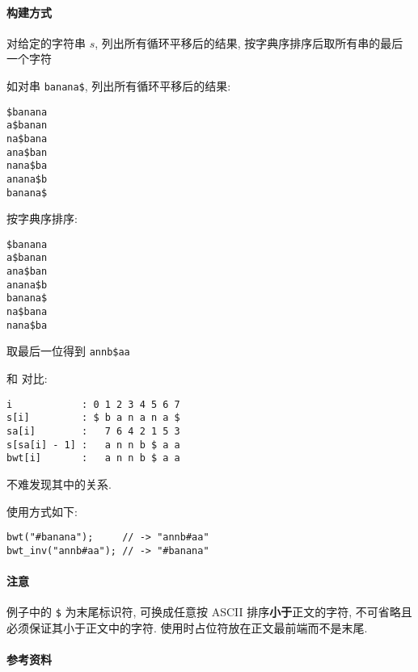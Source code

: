 \paragraph{构建方式}

对给定的字符串 \(s\), 列出所有循环平移后的结果, 按字典序排序后取所有串的最后一个字符

如对串 \verb|banana$|, 列出所有循环平移后的结果:

\begin{verbatim}
$banana
a$banan
na$bana
ana$ban
nana$ba
anana$b
banana$
\end{verbatim}
    
按字典序排序:

\begin{verbatim}
$banana
a$banan
ana$ban
anana$b
banana$
na$bana
nana$ba
\end{verbatim}
    
取最后一位得到 \verb|annb$aa|

和  对比:

\begin{verbatim}
i            : 0 1 2 3 4 5 6 7
s[i]         : $ b a n a n a $
sa[i]        :   7 6 4 2 1 5 3
s[sa[i] - 1] :   a n n b $ a a
bwt[i]       :   a n n b $ a a
\end{verbatim}

不难发现其中的关系.

使用方式如下:

\begin{verbatim}
bwt("#banana");     // -> "annb#aa"
bwt_inv("annb#aa"); // -> "#banana"
\end{verbatim}

\paragraph{注意}

例子中的 \verb|$| 为末尾标识符, 可换成任意按 ASCII 排序\textbf{小于}正文的字符, 不可省略且必须保证其小于正文中的字符. 使用时占位符放在正文最前端而不是末尾.

\paragraph{参考资料} \cite{enwiki:1214062423}
